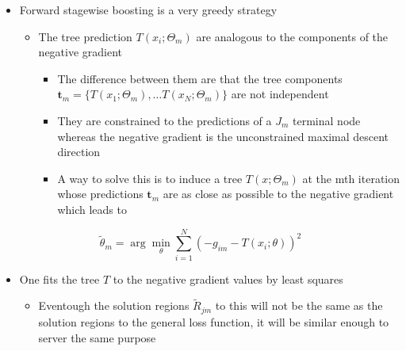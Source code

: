 \documentclass[11pt]{article}
\begin{document}
\begin{itemize}
\item Forward stagewise boosting is a very greedy strategy
\begin{itemize}
\item The tree prediction \(T(x_i;\Theta_m)\) are analogous to the components of the negative gradient
\begin{itemize}
\item The difference between them are that the tree components \(\pmb t_m = \{T(x_1; \Theta_m), \dots T(x_N; \Theta_m)\}\) are not independent
\item They are constrained to the predictions of a \(J_m\) terminal node whereas the negative gradient is the unconstrained maximal descent direction
\item A way to solve this is to induce a tree \(T(x;\Theta_m)\) at the mth iteration whose predictions \(\pmb t_m\) are as close as possible to the negative gradient which leads to
\end{itemize}
\end{itemize}
\end{itemize}
\begin{equation}
    \tilde \theta_m = \arg \min_\theta \sum_{i=1}^N (-g_{im}-T(x_i;\theta))^2
\end{equation}
\begin{itemize}
\item One fits the tree \(T\) to the negative gradient values by least squares
\begin{itemize}
\item Eventough the solution regions \(\tilde R_{jm}\) to this will not be the same as the solution regions to the general loss function, it will be similar enough to server the same purpose
\end{itemize}
\end{itemize}
\end{document}
